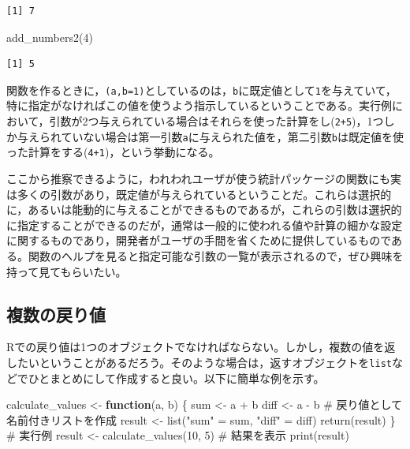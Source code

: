 \documentclass[
  a4paper,
]{ltjsbook}
\newenvironment{Shaded}{\begin{snugshade}}{\end{snugshade}}
\newcommand{\CommentTok}[1]{\textcolor[rgb]{0.37,0.37,0.37}{#1}}
\newcommand{\ControlFlowTok}[1]{\textcolor[rgb]{0.00,0.23,0.31}{\textbf{#1}}}
\newcommand{\DecValTok}[1]{\textcolor[rgb]{0.68,0.00,0.00}{#1}}
\newcommand{\FunctionTok}[1]{\textcolor[rgb]{0.28,0.35,0.67}{#1}}
\newcommand{\NormalTok}[1]{\textcolor[rgb]{0.00,0.23,0.31}{#1}}
\newcommand{\OtherTok}[1]{\textcolor[rgb]{0.00,0.23,0.31}{#1}}
\newcommand{\SpecialCharTok}[1]{\textcolor[rgb]{0.37,0.37,0.37}{#1}}
\newcommand{\StringTok}[1]{\textcolor[rgb]{0.13,0.47,0.30}{#1}}
\begin{document}
\begin{verbatim}
[1] 7
\end{verbatim}

\begin{Shaded}
\begin{Highlighting}[]
\FunctionTok{add\_numbers2}\NormalTok{(}\DecValTok{4}\NormalTok{)}
\end{Highlighting}
\end{Shaded}

\begin{verbatim}
[1] 5
\end{verbatim}

関数を作るときに，\texttt{(a,b=1)}としているのは，\texttt{b}に既定値として\texttt{1}を与えていて，特に指定がなければこの値を使うよう指示しているということである。実行例において，引数が2つ与えられている場合はそれらを使った計算をし(\texttt{2+5})，1つしか与えられていない場合は第一引数\texttt{a}に与えられた値を，第二引数\texttt{b}は既定値を使った計算をする(\texttt{4+1})，という挙動になる。

ここから推察できるように，われわれユーザが使う統計パッケージの関数にも実は多くの引数があり，既定値が与えられているということだ。これらは選択的に，あるいは能動的に与えることができるものであるが，これらの引数は選択的に指定することができるのだが，通常は一般的に使われる値や計算の細かな設定に関するものであり，開発者がユーザの手間を省くために提供しているものである。関数のヘルプを見ると指定可能な引数の一覧が表示されるので，ぜひ興味を持って見てもらいたい。

\subsection{複数の戻り値}\label{ux8907ux6570ux306eux623bux308aux5024}

Rでの戻り値は1つのオブジェクトでなければならない。しかし，複数の値を返したいということがあるだろう。そのような場合は，返すオブジェクトを\texttt{list}などでひとまとめにして作成すると良い。以下に簡単な例を示す。

\begin{Shaded}
\begin{Highlighting}[]
\NormalTok{calculate\_values }\OtherTok{\textless{}{-}} \ControlFlowTok{function}\NormalTok{(a, b) \{}
\NormalTok{  sum }\OtherTok{\textless{}{-}}\NormalTok{ a }\SpecialCharTok{+}\NormalTok{ b}
\NormalTok{  diff }\OtherTok{\textless{}{-}}\NormalTok{ a }\SpecialCharTok{{-}}\NormalTok{ b}
  \CommentTok{\# 戻り値として名前付きリストを作成}
\NormalTok{  result }\OtherTok{\textless{}{-}} \FunctionTok{list}\NormalTok{(}\StringTok{"sum"} \OtherTok{=}\NormalTok{ sum, }\StringTok{"diff"} \OtherTok{=}\NormalTok{ diff)}
  \FunctionTok{return}\NormalTok{(result)}
\NormalTok{\}}
\CommentTok{\# 実行例}
\NormalTok{result }\OtherTok{\textless{}{-}} \FunctionTok{calculate\_values}\NormalTok{(}\DecValTok{10}\NormalTok{, }\DecValTok{5}\NormalTok{)}
\CommentTok{\# 結果を表示}
\FunctionTok{print}\NormalTok{(result)}
\end{Highlighting}
\end{Shaded}
\end{document}
